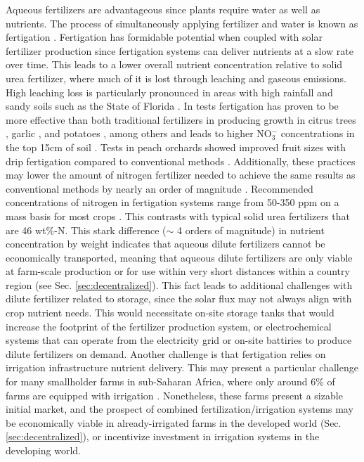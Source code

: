Aqueous fertilizers are advantageous since plants require water as well as nutrients. The process of simultaneously applying fertilizer and water is known as fertigation \cite{kafkafi2011fertigation,goyal2016water}. Fertigation has formidable potential when coupled with solar fertilizer production since fertigation systems can deliver nutrients at a slow rate over time. This leads to a lower overall nutrient concentration relative to solid urea fertilizer, where much of it is lost through leaching and gaseous emissions. High leaching loss is particularly pronounced in areas with high rainfall and sandy soils such as the State of Florida \cite{kadyampakeni_2015}. In tests fertigation has proven to be more effective than both traditional fertilizers in producing growth in citrus trees \cite{Morgan2009}, garlic \cite{Jamil_Mohammad_2002}, and potatoes \cite{Feng_2017}, among others \cite{Bar_Yosef_1999,kafkafi2011fertigation} and leads to higher NO$_3^-$ concentrations in the top 15cm of soil \cite{Willis1991}. Tests in peach orchards showed improved fruit sizes with drip fertigation compared to conventional methods \cite{Bryla2005}. Additionally, these practices may lower the amount of nitrogen fertilizer needed to achieve the same results as conventional methods by nearly an order of magnitude \cite{kadyampakeni_2015}. 
Recommended concentrations of nitrogen in fertigation systems range from 50-350 ppm on a mass basis for most crops \cite{phocaides2007handbook,Papadopoulos_1988}. This contrasts with typical solid urea fertilizers that are 46 wt\%-N. This stark difference ($\sim$ 4 orders of magnitude) in nutrient concentration by weight indicates that aqueous dilute fertilizers cannot be economically transported, meaning that aqueous dilute fertilizers are only viable at farm-scale production or for use within very short distances within a country region (see Sec. \ref{sec:decentralized}). This fact leads to additional challenges with dilute fertilizer related to storage, since the solar flux may not always align with crop nutrient needs. This would necessitate on-site storage tanks that would increase the footprint of the fertilizer production system, or electrochemical systems that can operate from the electricity grid or on-site battiries to produce dilute fertilizers on demand. Another challenge is that fertigation relies on irrigation infrastructure nutrient delivery. This may present a particular challenge for many smallholder farms in sub-Saharan Africa, where only around 6\%  of farms are equipped with irrigation \cite{You_2011}. Nonetheless, these farms present a sizable initial market, and the prospect of combined fertilization/irrigation systems may be economically viable in already-irrigated farms in the developed world (Sec. \ref{sec:decentralized}), or incentivize investment in irrigation systems in the developing world.

